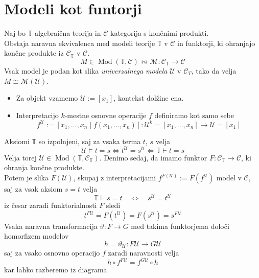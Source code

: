 \documentclass[12pt,a4paper]{book}
\theoremstyle{definition}
\theoremstyle{plain}
\theoremstyle{definition}
\theoremstyle{remark}
\DeclareMathOperator{\Mod}{Mod}
\begin{document}
\section{Modeli kot funtorji}
%
Naj bo $\mathbb{T}$ algebraična teorija in $\mathcal{C}$ kategorija s končnimi produkti.\\
Obstaja naravna ekvivalenca med modeli teorije $\mathbb{T}$ v $\mathcal{C}$ in funktorji, ki ohranjajo končne produkte iz $\mathcal{C}_\mathbb{T}$ v $\mathcal{C}$.
$$M \in \Mod(\mathbb{T}, \mathcal{C}) \leftrightsquigarrow \mathcal{M} : \mathcal{C}_\mathbb{T} \to \mathcal{C}$$
%
Vsak model je podan kot slika \emph{univerzalnega modela} $\mathcal{U}$ v $\mathcal{C}_T$, tako da velja $M \cong \mathcal{M}(\mathcal{U})$.
%
\begin{itemize}
\item Za objekt vzamemo $\mathcal{U} := [x_1]$, kontekst dolžine ena.
%
\item Interpretacijo $k$-mestne osnovne operacije $f$ definiramo kot samo sebe
$$f^\mathcal{U} := [x_1, \ldots, x_n \mid f(x_1, \ldots, x_n)] : \mathcal{U}^k = [x_1, \ldots, x_n] \to \mathcal{U} = [x_1]$$
\end{itemize}
%
Aksiomi $\mathbb{T}$ so izpolnjeni, saj za vsaka terma $t$, $s$ velja
$$\mathcal{U} \models t = s \Longleftrightarrow t^\mathcal{U} = s^\mathcal{U} \Longleftrightarrow \mathbb{T} \vdash t = s$$
Velja torej $\mathcal{U} \in \Mod(\mathbb{T}, \mathcal{C}_\mathbb{T})$.
%
Denimo sedaj, da imamo funktor $F : \mathcal{C}_\mathbb{T} \to \mathcal{C}$, ki ohranja končne produkte. \\
Potem je slika $F(\mathcal{U})$, skupaj z interpretacijami $f^{F(\mathcal{U})} := F(f^\mathcal{U})$ model v $\mathcal{C}$, saj za vsak aksiom $s = t$ velja
$$\mathbb{T} \vdash s = t \quad \Longleftrightarrow \quad s^\mathcal{U} = t^\mathcal{U}$$
%
iz česar zaradi funktorialnosti $F$ sledi
$$t^{F\mathcal{U}} = F(t^\mathcal{U}) = F(s^\mathcal{U}) = s^{F\mathcal{U}}$$
%
Vsaka naravna transformacija $\vartheta : F \to G$ med takima funktorjema določi homorfizem modelov $$h = \vartheta_\mathcal{U} : F\mathcal{U} \to G\mathcal{U}$$
%
saj za vsako osnovno operacijo $f$ zaradi naravnosti velja
$$h \circ f^{F\mathcal{U}} = f^{G\mathcal{U}} \circ h$$
kar lahko razberemo iz diagrama
\begin{center}
\end{center}
%
\end{document}
